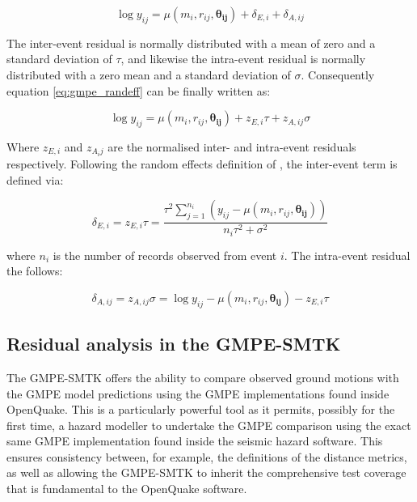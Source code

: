 \begin{equation}
\log y_{ij} = \mu \left( {m_i, r_{ij}, \mathbf{\theta_{ij}}} \right) +  \delta_{E, i} + \delta_{A, ij}
\label{eq:gmpe_randeff}
\end{equation}

The inter-event residual is normally distributed with a mean of zero and a standard deviation of $\tau$, and likewise the intra-event residual is normally distributed with a zero mean and a standard deviation of $\sigma$. 
Consequently equation \ref{eq:gmpe_randeff} can be finally written as:

\begin{equation}
\log y_{ij} = \mu \left( {m_i, r_{ij}, \mathbf{\theta_{ij}}} \right) +  z_{E,i}\tau + z_{A, ij}\sigma
\label{eq:gmpe_re_resid}
\end{equation}

Where $z_{E, i}$ and $z_{A_ ij}$ are the normalised inter- and intra-event residuals respectively. Following the random effects definition of \textcite{AbrahamsonYoungs1992}, the inter-event term is defined via:

\begin{equation}
\delta_{E, i} = z_{E, i} \tau = \frac{\tau^2 \sum\limits_{j = 1}^{n_i} \left( {y_{ij} - \mu \left( {m_i, r_{ij}, \mathbf{\theta_{ij}}} \right)}\right)}{n_i \tau^2 + \sigma^2}
\label{eq:inter_res}
\end{equation}

\noindent where $n_i$ is the number of records observed from event $i$. The intra-event residual the follows:

\begin{equation}
\delta_{A, ij} = z_{A, ij}\sigma = \log y_{ij} - \mu \left( {m_i, r_{ij}, \mathbf{\theta_{ij}}} \right) - z_{E, i}\tau
\label{eq:intra_res}
\end{equation}

\subsection{Residual analysis in the GMPE-SMTK}

The GMPE-SMTK offers the ability to compare observed ground motions with the GMPE model predictions using the GMPE implementations found inside OpenQuake. This is a particularly powerful tool as it permits, possibly for the first time, a hazard modeller to undertake the GMPE comparison using the exact same GMPE implementation found inside the seismic hazard software. This ensures consistency between, for example, the definitions of the distance metrics, as well as allowing the GMPE-SMTK to inherit the comprehensive test coverage that is fundamental to the OpenQuake software. 

